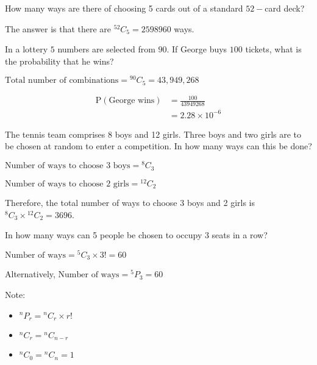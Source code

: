 \documentclass[11pt,a4paper]{book}
\begin{document}
How many ways are there of choosing 5 cards out of a standard $52-$card deck?

The answer is that there are $^{52}C_{5}=2598960$ ways.

\begin{example}

In a lottery $5$ numbers are selected from $90$. If George buys
$100$ tickets, what is the probability that he wins?

\Solution

$\text{Total number of combinations}={}^{90}C_{5}=43,949,268$

\begin{align*}
\text{P}\left(\text{George wins}\right) & =\frac{100}{43949268}\\
 & =2.28\times10^{-6}
\end{align*}

\end{example}

\begin{example}

The tennis team comprises 8 boys and 12 girls. Three boys and two
girls are to be chosen at random to enter a competition. In how many
ways can this be done?


\Solution


$\text{Number of ways to choose 3 boys}={}^{8}C_{3}$

$\text{Number of ways to choose 2 girls}={}^{12}C_{2}$

Therefore, the total number of ways to choose 3 boys and 2 girls is
$^{8}C_{3}\times{}^{12}C_{2}=3696$.


\end{example}

\begin{example}

In how many ways can 5 people be chosen to occupy 3 seats in a row?

\Solution

$\text{Number of ways}={}^{5}C_{3}\times3!=60$

Alternatively, $\text{Number of ways}={}^{5}P_{3}=60$
\end{example}


Note:
\begin{itemize}
\item $^{n}P_{r}={}^{n}C_{r}\times r!$
\item $^{n}C_{r}={}^{n}C_{n-r}$
\item $^{n}C_{0}={}^{n}C_{n}=1$
\end{itemize}
\end{document}
